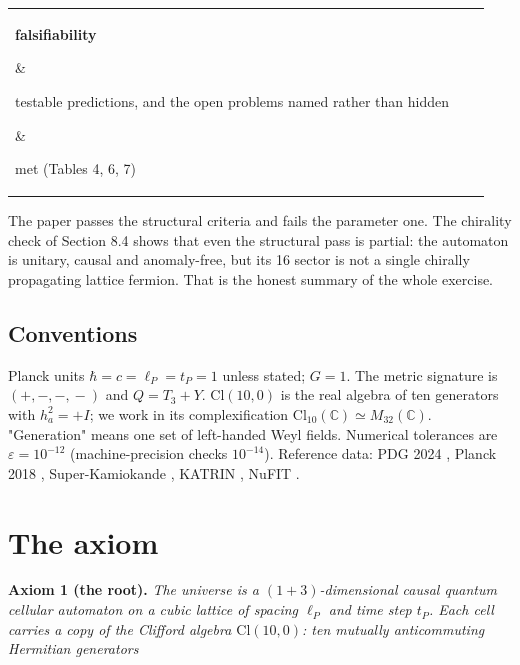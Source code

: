 \documentclass[aps,prd,amsmath,amssymb,superscriptaddress,longbibliography,floatfix,preprint]{revtex4-2}
\begin{document}
{\begin{longtable}{lll}
\arrayrulecolor{black!40}\hline\arrayrulecolor{black}
\parbox[c]{3.77cm}{\vspace{2.5pt}\raggedright {} \textbf{falsifiability}\vspace{2.5pt}} & \parbox[c]{4.77cm}{\vspace{2.5pt}\raggedright {} testable predictions, and the open problems named rather than hidden\vspace{2.5pt}} & \parbox[c]{6.55cm}{\vspace{2.5pt}\raggedright {} met (Tables 4, 6, 7)\vspace{2.5pt}} \\
\end{longtable}
}

The paper passes the structural criteria and fails the parameter one. The chirality check of Section 8.4 shows that even the structural pass is partial: the automaton is unitary, causal and anomaly-free, but its 16 sector is not a single chirally propagating lattice fermion. That is the honest summary of the whole exercise.

\subsection{Conventions}

Planck units $\hbar = c = \ell_P = t_P = 1$ unless stated; $G = 1$. The metric signature is $(+,\allowbreak{}-,\allowbreak{}-,\allowbreak{}-)$ and $Q = T_3 + Y$. $\mathrm{Cl}(10,\allowbreak{}0)$ is the real algebra of ten generators with $h_a^2 = +I$; we work in its complexification $\mathrm{Cl}_{10}(\mathbb{C}) \simeq M_{32}(\mathbb{C})$. "Generation" means one set of left-handed Weyl fields. Numerical tolerances are $\varepsilon = 10^{-12}$ (machine-precision checks $10^{-14}$). Reference data: PDG 2024 \cite{ref13}, Planck 2018 \cite{ref14}, Super-Kamiokande \cite{ref15}, KATRIN \cite{ref16}, NuFIT \cite{ref17}.

\section{The axiom}

\textbf{Axiom 1 (the root).} \emph{The universe is a $(1{+}3)$-dimensional causal quantum cellular automaton on a cubic lattice of spacing $\ell_P$ and time step $t_P$. Each cell carries a copy of the Clifford algebra $\mathrm{Cl}(10,\allowbreak{}0)$: ten mutually anticommuting Hermitian generators}
\end{document}
